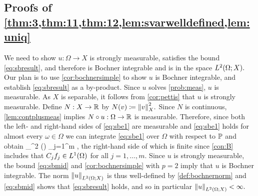 \subsection{Proofs of \cref{thm:3,thm:11,thm:12,lem:svarwelldefined,lem:uniq}}
\label{page:thm3proof}
We need to show $u:\Omega \rightarrow X$ is strongly measurable, satisfies the bound \eqref{eq:sbresult}, and therefore is Bochner integrable and is in the space $\LtOX.$ Our plan is to use \cref{cor:bochnersimple} to show $u$ is Bochner integrable, and establish \eqref{eq:sbresult} as a by-product. Since $u$ solves \cref{prob:meas}, $u$ is measurable. As $X$ is separable, it follows from \cref{cor:pettis} that $u$ is strongly measurable.
Define $N:X \rightarrow \mathbb R$ by
$ N(v) \de \N{v}_X^2.$
Since $N$ is continuous, \cref{lem:contplusmeas} implies $N \circ u:\Omega \rightarrow \mathbb R$ is measurable. 
Therefore, since both the left- and right-hand sides of \eqref{eq:sbe1} are measurable and \eqref{eq:sbe1} holds for almost every $\omega \in \Omega$ we can integrate \eqref{eq:sbe1} over $\Omega$ with respect to $\mathbb P$ and obtain
\beq\label{eq:sbmid}
\int_\Omega {}^2 \dd\PP(\omega) \leq \sum_{j=1}^m \NLoO{\Cj\fj},
\eeq
the right-hand side of which is finite since \cref{con:B} includes that $\Cj\fj \in \LoO$ for all $j = 1,\ldots,m.$ Since $u$ is strongly measurable, the bound \eqref{eq:sbmid} and \cref{cor:bochnersimple} with $p=2$ imply that $u$ is Bochner integrable. The norm $\NLtOX{u}$ is thus well-defined by \cref{def:bochnernorm} and \eqref{eq:sbmid} shows that \eqref{eq:sbresult} holds, and so in particular $\NLtOX{u} < \infty.$
\epf

